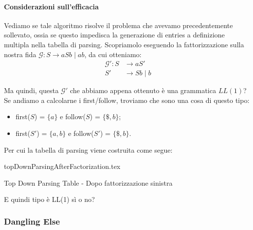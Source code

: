 \documentclass[class=book, crop=false, oneside, 12pt]{standalone}
\begin{document}
\paragraph{Considerazioni sull'efficacia}
Vediamo se tale algoritmo risolve il problema che avevamo precedentemente sollevato, ossia se questo impedisca la generazione di entries a definizione multipla nella tabella di parsing. Scopriamolo eseguendo la fattorizzazione sulla nostra fida \(\mathcal{G}: S \to aSb \mid ab\), da cui otteniamo:
\begin{align*}
    \mathcal{G}': S &\rightarrow aS' \\
    S' &\rightarrow Sb \mid b
\end{align*}

Ma quindi, questa \(\mathcal{G}'\) che abbiamo appena ottenuto è una grammatica \(LL(1)\)? Se andiamo a calcolarne i first/follow, troviamo che sono una cosa di questo tipo:
\begin{itemize}
    \item first(\(S\)) = \(\{a\}\) e follow(\(S\)) = \(\{\$, b\}\);
    \item first(\(S'\)) = \(\{a, b\}\) e follow(\(S'\)) = \(\{\$, b\}\).
\end{itemize}
Per cui la tabella di parsing viene costruita come segue:
\begin{table}[H]
    \centering
    {topDownParsingAfterFactorization.tex}
    \caption{Top Down Parsing Table - Dopo fattorizzazione sinistra}
    \label{topDownParsingAfterFactorization}
\end{table}
E quindi tipo è LL(1) sì o no?

\subsubsection{Dangling Else}
\end{document}
